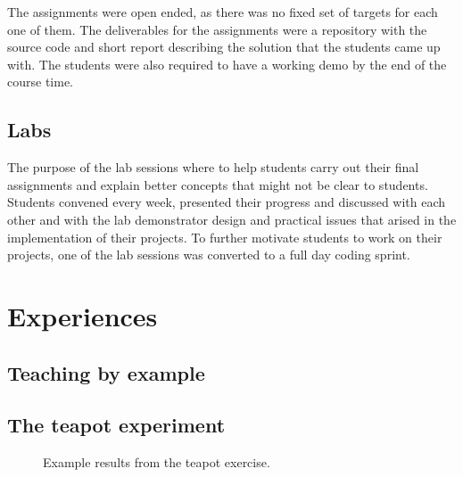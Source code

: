 \documentclass[conference]{IEEEtran}
\begin{document}
The assignments were open ended, as there was no fixed set of targets for
each one of them. The deliverables for the assignments were a repository
with the source code and short report describing the solution that the
students came up with. The students were also required to have a working
demo by the end of the course time.

\subsection{Labs}

The purpose of the lab sessions where to help students carry out their final
assignments and explain better concepts that might not be clear to students. 
Students convened every week, presented their progress and discussed with 
each other and with the lab demonstrator design and practical issues that
arised in the implementation of their projects. To further motivate students
to work on their projects, one of the lab sessions was converted to a full
day coding sprint.

\section{Experiences}

\subsection{Teaching by example}



\subsection{The teapot experiment}

\begin{figure*}
\centering
\label{fig:teapots}
\caption[]{Example results from the teapot exercise.}
\end{figure*}
\end{document}

